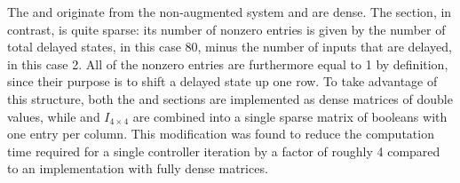 The  and  originate from the non-augmented system and are dense. 
The  section, in contrast, is quite sparse: its number of nonzero entries is given by the number of total delayed states, in this case 80, minus the number of inputs that are delayed, in this case 2. 
All of the nonzero entries are furthermore equal to 1 by definition, since their purpose is to shift a delayed state up one row.
To take advantage of this structure, both the  and  sections are implemented as dense matrices of double values, while  and $I_{4\times 4}$ are combined into a single sparse matrix of booleans with one entry per column.
This modification was found to reduce the computation time required for a single controller iteration by a factor of roughly 4 compared to an implementation with fully dense matrices.

